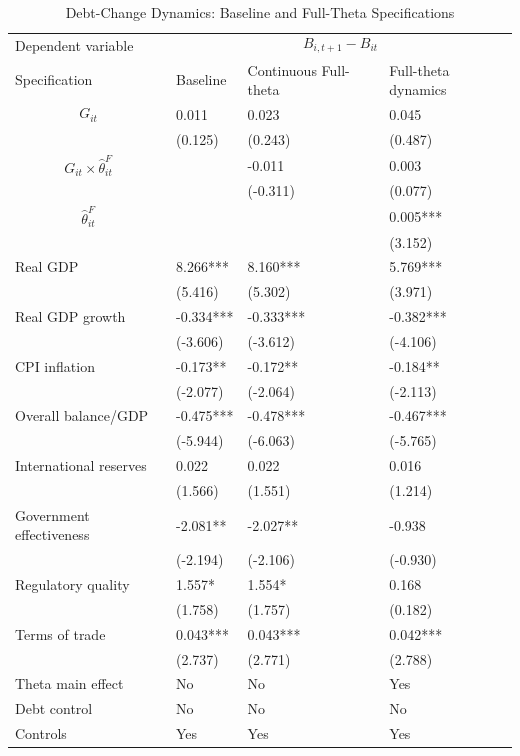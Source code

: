 \begin{table}[H]\centering
\begin{threeparttable}
\caption{Debt-Change Dynamics: Baseline and Full-Theta Specifications}
\label{tab:debt_change_combined_fulltheta}
\scriptsize
\begin{tabularx}{\textwidth}{lYYY}
\toprule
Dependent variable &  \\
\cmidrule(lr){2-4}
Specification & Baseline & Continuous Full-theta & Full-theta dynamics \\
\midrule
$$G_{it}$$ & 0.011 & 0.023 & 0.045 \\
 & (0.125) & (0.243) & (0.487) \\
$$G_{it}\times\widehat{\theta}^{F}_{it}$$ &  & -0.011 & 0.003 \\
 &  & (-0.311) & (0.077) \\
$$\widehat{\theta}^{F}_{it}$$ &  &  & 0.005*** \\
 &  &  & (3.152) \\
Real GDP & 8.266*** & 8.160*** & 5.769*** \\
 & (5.416) & (5.302) & (3.971) \\
Real GDP growth & -0.334*** & -0.333*** & -0.382*** \\
 & (-3.606) & (-3.612) & (-4.106) \\
CPI inflation & -0.173** & -0.172** & -0.184** \\
 & (-2.077) & (-2.064) & (-2.113) \\
Overall balance/GDP & -0.475*** & -0.478*** & -0.467*** \\
 & (-5.944) & (-6.063) & (-5.765) \\
International reserves & 0.022 & 0.022 & 0.016 \\
 & (1.566) & (1.551) & (1.214) \\
Government effectiveness & -2.081** & -2.027** & -0.938 \\
 & (-2.194) & (-2.106) & (-0.930) \\
Regulatory quality & 1.557* & 1.554* & 0.168 \\
 & (1.758) & (1.757) & (0.182) \\
Terms of trade & 0.043*** & 0.043*** & 0.042*** \\
 & (2.737) & (2.771) & (2.788) \\
\midrule
Theta main effect & No & No & Yes \\
Debt control & No & No & No \\
Controls & Yes & Yes & Yes \\

\end{tabularx}
\end{threeparttable}
\end{table}
